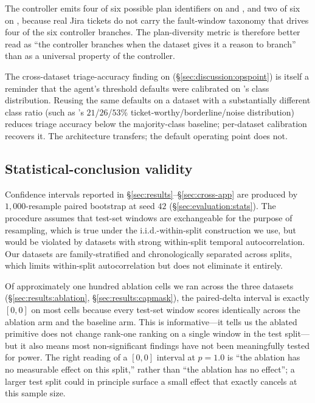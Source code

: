  The controller emits four of six possible plan identifiers on \dsob{} and \dsotel{}, and two of six on \dswol{}, because real Jira tickets do not carry the fault-window taxonomy that drives four of the six controller branches. The plan-diversity metric is therefore better read as ``the controller branches when the dataset gives it a reason to branch'' than as a universal property of the controller.

 The cross-dataset triage-accuracy finding on \dswol{} (\S\ref{sec:discussion:opspoint}) is itself a reminder that the agent's threshold defaults were calibrated on \dsob{}'s class distribution. Reusing the same defaults on a dataset with a substantially different class ratio (such as \dswol{}'s $21$/$26$/$53$\% ticket-worthy/borderline/noise distribution) reduces triage accuracy below the majority-class baseline; per-dataset calibration recovers it. The architecture transfers; the default operating point does not.

\subsection{Statistical-conclusion validity}
\label{sec:threats:statistical}

 Confidence intervals reported in \S\ref{sec:results}--\S\ref{sec:cross-app} are produced by $1{,}000$-resample paired bootstrap at seed $42$ (\S\ref{sec:evaluation:stats}). The procedure assumes that test-set windows are exchangeable for the purpose of resampling, which is true under the i.i.d.-within-split construction we use, but would be violated by datasets with strong within-split temporal autocorrelation. Our datasets are family-stratified and chronologically separated across splits, which limits within-split autocorrelation but does not eliminate it entirely.

 Of approximately one hundred ablation cells we ran across the three datasets (\S\ref{sec:results:ablation}, \S\ref{sec:results:capmask}), the paired-delta interval is exactly $[0, 0]$ on most cells because every test-set window scores identically across the ablation arm and the baseline arm. This is informative---it tells us the ablated primitive does not change rank-one ranking on a single window in the test split---but it also means most non-significant findings have not been meaningfully tested for power. The right reading of a $[0, 0]$ interval at $p = 1.0$ is ``the ablation has no measurable effect on this split,'' rather than ``the ablation has no effect''; a larger test split could in principle surface a small effect that exactly cancels at this sample size.

